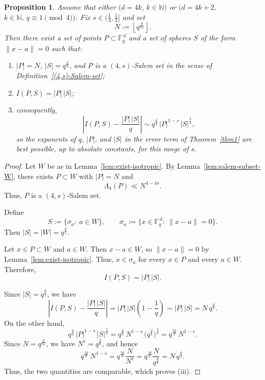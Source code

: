 \documentclass{article}
\newtheorem{proposition}[theorem]{Proposition}
\def\steven#1{\noindent
\textcolor{red}
{\textsc{(Steven:}
\textsf{#1})}}
\begin{document}
\begin{proposition}\label{prop:sharpness-general-s}
Assume that either $(d=4k$, $k \in \mathbb{N})$ or $(d=4k+2$, $k \in \mathbb{N}, ~q \equiv 1 \pmod {4})$.
Fix $s\in(\frac14,\frac12]$ and set
\[
N:=\left\lfloor q^{\frac{d}{8s}}\right\rfloor. %
\]
Then there exist a set of points $P\subset \mathbb{F}_q^{\,d}$ and a set of spheres $S$ of the form
$\|x-a\|=0$ such that:
\begin{enumerate}
\item[(i)] $|P|=N$, $|S|=q^{\frac d2}$, and $P$ is a $(4,s)$-Salem set in the sense of
Definition~\ref{(4,s)-Salem-set};
\item[(ii)] $I(P,S)=|P|\,|S|$;
\item[(iii)] consequently,
\[
\left|I(P,S)-\frac{|P|\,|S|}{q}\right|
\sim
q^{\frac{d}{4}}\,|P|^{1-s}\,|S|^{\frac{3}{4}},
\]
so the exponents of $q$, $|P|$, and $|S|$ in the error term of Theorem~\ref{thm1}
are best possible, up to absolute constants, for this range of $s$.
\end{enumerate}
\end{proposition}

\begin{proof}
Let $W$ be as in Lemma~\ref{lem:exist-isotropic}.
By Lemma~\ref{lem:salem-subset-W}, there exists $P\subset W$ with $|P|=N$ and
\[
\Lambda_4(P)\ll N^{4-4s}.
\]
Thus, $P$ is a $(4,s)$-Salem set.

Define
\[
S:=\{\sigma_a:\ a\in W\},
\qquad
\sigma_a:=\{x\in\mathbb{F}_q^{\,d}:\ \|x-a\|=0\}.
\]
Then $|S|=|W|=q^{\frac d2}$.

Let $x\in P\subset W$ and $a\in W$.
Then $x-a\in W$, so $\|x-a\|=0$ by Lemma~\ref{lem:exist-isotropic}.
Thus, $x\in \sigma_a$ for every $x\in P$ and every $a\in W$.
Therefore,
\[
I(P,S)=|P|\,|S|.
\]

Since $|S|=q^{\frac d2}$, we have
\[
\left|I(P,S)-\frac{|P|\,|S|}{q}\right|
=
|P|\,|S|\left(1-\frac1q\right)
\sim
|P|\,|S|
=
N\,q^{\frac d2}.
\]
On the other hand,
\[
q^{\frac d4}\,|P|^{1-s}\,|S|^{\frac34}
=
q^{\frac d4}\,N^{1-s}\,\bigl(q^{\frac d2}\bigr)^{\frac34}
=
q^{\frac{5d}{8}}\,N^{1-s}.
\]
Since $N=q^{\frac{d}{8s}}$, we have $N^{s}=q^{\frac d8}$, and hence
\[
q^{\frac{5d}{8}}\,N^{1-s}
=
q^{\frac{5d}{8}}\frac{N}{N^{s}}
=
q^{\frac{5d}{8}}\frac{N}{q^{\frac d8}}
=
N\,q^{\frac d2}.
\]
Thus, the two quantities are comparable, which proves (iii).
\end{proof}
\end{document}
